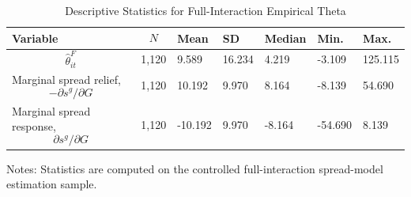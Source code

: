 \begin{table}[H]\centering
\begin{threeparttable}
\caption{Descriptive Statistics for Full-Interaction Empirical Theta}
\label{tab:theta_descriptive_stats}
\scriptsize
\begin{tabularx}{\textwidth}{lYYYYYY}
\toprule
Variable & $$N$$ & Mean & SD & Median & Min. & Max. \\
\midrule
$$\widehat{\theta}^{F}_{it}$$ & 1,120 & 9.589 & 16.234 & 4.219 & -3.109 & 125.115 \\
Marginal spread relief, $$-\partial s^g/\partial G$$ & 1,120 & 10.192 & 9.970 & 8.164 & -8.139 & 54.690 \\
Marginal spread response, $$\partial s^g/\partial G$$ & 1,120 & -10.192 & 9.970 & -8.164 & -54.690 & 8.139 \\
\bottomrule
\end{tabularx}
\begin{tablenotes}[flushleft]\footnotesize
\item Notes: Statistics are computed on the controlled full-interaction spread-model estimation sample.
\end{tablenotes}
\end{threeparttable}
\end{table}
